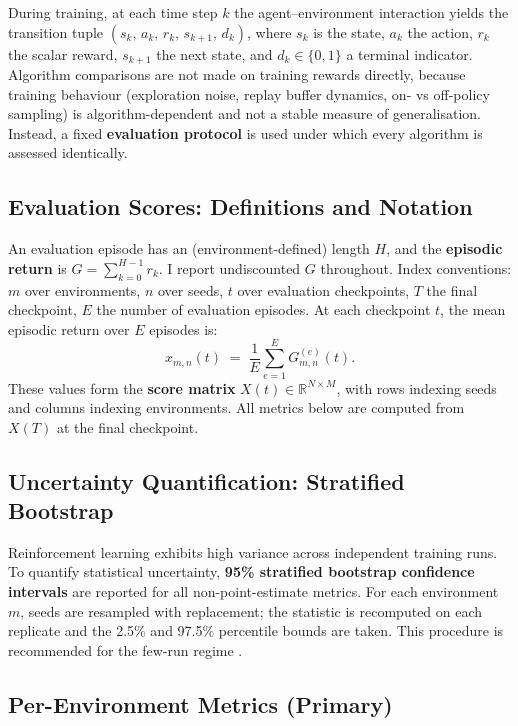 During training, at each time step $k$ the agent--environment interaction yields the transition tuple $(s_k,\,a_k,\,r_k,\,s_{k+1},\,d_k)$, where $s_k$ is the state, $a_k$ the action, $r_k$ the scalar reward, $s_{k+1}$ the next state, and $d_k\!\in\!\{0,1\}$ a terminal indicator. Algorithm comparisons are not made on training rewards directly, because training behaviour (exploration noise, replay buffer dynamics, on- vs off-policy sampling) is algorithm-dependent and not a stable measure of generalisation. Instead, a fixed \textbf{evaluation protocol} is used under which every algorithm is assessed identically.

\subsection{Evaluation Scores: Definitions and Notation}
\label{subsec:eval-scores}

An evaluation episode has an (environment-defined) length $H$, and the \textbf{episodic return} is $G = \sum_{k=0}^{H-1} r_k$. I report undiscounted $G$ throughout. Index conventions: $m$ over environments, $n$ over seeds, $t$ over evaluation checkpoints, $T$ the final checkpoint, $E$ the number of evaluation episodes. At each checkpoint $t$, the mean episodic return over $E$ episodes is:
\[
x_{m,n}(t)\;=\;\frac{1}{E}\sum_{e=1}^{E}G^{(e)}_{m,n}(t).
\]
These values form the \textbf{score matrix} $X(t)\in\mathbb{R}^{N\times M}$, with rows indexing seeds and columns indexing environments. All metrics below are computed from $X(T)$ at the final checkpoint.

\subsection{Uncertainty Quantification: Stratified Bootstrap}
\label{subsec:bootstrap}

Reinforcement learning exhibits high variance across independent training runs. To quantify statistical uncertainty, \textbf{95\% stratified bootstrap confidence intervals} are reported for all non-point-estimate metrics. For each environment $m$, seeds are resampled with replacement; the statistic is recomputed on each replicate and the 2.5\% and 97.5\% percentile bounds are taken. This procedure is recommended for the few-run regime \citep{agarwal2021precipice}.

\subsection{Per-Environment Metrics (Primary)}
\label{subsec:per-env-metrics}

